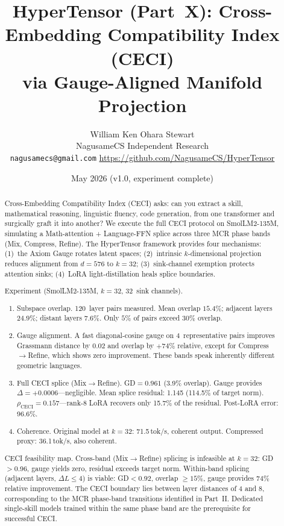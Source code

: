\documentclass[11pt]{article}
\title{HyperTensor (Part~X): Cross-Embedding Compatibility Index (CECI)\\via Gauge-Aligned Manifold Projection}
\author{William Ken Ohara Stewart\\
\small NagusameCS Independent Research\\
\small \texttt{nagusamecs@gmail.com} \quad \url{https://github.com/NagusameCS/HyperTensor}}
\date{May 2026 (v1.0, experiment complete)}
\begin{document}
\maketitle
\hypertensorbanner

\begin{abstract}
\noindent
Cross-Embedding Compatibility Index (CECI) asks: can you extract a
skill, mathematical reasoning, linguistic fluency, code
generation, from one transformer and surgically graft it into another?
We execute the full CECI protocol on SmolLM2-135M, simulating a
Math-attention + Language-FFN splice across three MCR phase bands
(Mix, Compress, Refine).  The HyperTensor framework provides four
mechanisms: (1)~the Axiom Gauge rotates latent spaces; (2)~intrinsic
$k$-dimensional projection reduces alignment from $d{=}576$ to
$k{=}32$; (3)~sink-channel exemption protects attention sinks;
(4)~LoRA light-distillation heals splice boundaries.

Experiment (SmolLM2-135M, $k{=}32$, 32~sink channels).
\begin{enumerate}
\item Subspace overlap.  120~layer pairs measured.  Mean
      overlap $15.4\%$; adjacent layers $24.9\%$; distant layers
      $7.6\%$.  Only $5\%$ of pairs exceed $30\%$ overlap.
\item Gauge alignment.  A fast diagonal-cosine gauge on
      4~representative pairs improves Grassmann distance by $0.02$
      and overlap by $+74\%$ relative, except for
      Compress$\to$Refine, which shows zero improvement.
      These bands speak inherently different geometric languages.
\item Full CECI splice (Mix$\to$Refine).  GD$=0.961$
      (3.9\% overlap).  Gauge provides $\Delta{=}{+}0.0006$---negligible.
      Mean splice residual: 1.145 (114.5\% of target norm).
      $\rho_{\mathrm{CECI}}{=}0.157$---rank-8 LoRA recovers only
      15.7\% of the residual.  Post-LoRA error: 96.6\%.
\item Coherence.  Original model at $k{=}32$: 71.5\,tok/s,
      coherent output.  Compressed proxy: 36.1\,tok/s, also coherent.
\end{enumerate}

CECI feasibility map.  Cross-band (Mix$\to$Refine) splicing
is infeasible at $k{=}32$: GD$>$0.96, gauge yields zero,
residual exceeds target norm.  Within-band splicing (adjacent
layers, $\Delta L{\le}4$) is viable: GD${<}0.92$, overlap
${\ge}15\%$, gauge provides $74\%$ relative improvement.  The CECI
boundary lies between layer distances of 4 and 8, corresponding to
the MCR phase-band transitions identified in Part~II.  Dedicated
single-skill models trained within the same phase band are the
prerequisite for successful CECI.
\end{abstract}
\end{document}
